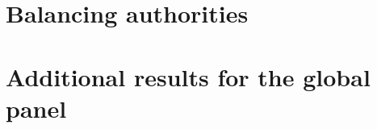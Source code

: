 \section{Balancing authorities}\label{app:data}

\begin{table}[h]
\centering
\caption{The 46 balancing authorities, ordered by mean hourly demand over 2019--2026. Flex.: interchange flexibility in 2019 (range between the 5th and 95th percentiles of hourly total interchange, divided by mean demand). $\tau_i$: calibrated critical ratio.}\label{tab:bas}
\scriptsize

\end{table}

\section{Additional results for the global panel}\label{app:global}

\begin{table}[h]
\centering
\caption{Global panel with the main candidate set (eleven candidates including the weather models): system cost relative to the reference forecaster for estimation windows of 14 and 28 days (world). Lower is better: values below 1 mean a lower cost than the benchmark.}\label{tab:globalwindows}
\small

\end{table}

\begin{table}[h]
\centering
\caption{Global panel with the main candidate set and with a common critical ratio $\tau=0.9$ for every grid area ($W=28$): system cost relative to the reference forecaster. The neural gate was not run for this specification. Lower is better: values below 1 mean a lower cost than the benchmark.}\label{tab:globaltau}
\small

\end{table}
